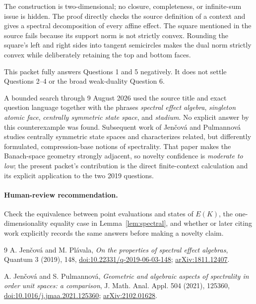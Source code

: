 \documentclass[11pt]{article}
\begin{document}
The construction is two-dimensional; no closure, completeness, or
infinite-sum issue is hidden.  The proof directly checks the source
definition of a context and gives a spectral decomposition of every affine
effect.  The square mentioned in the source fails because its support norm
is not strictly convex.  Rounding the square's left and right sides into
tangent semicircles makes the dual norm strictly convex while deliberately
retaining the top and bottom faces.

This packet fully answers Questions 1 and 5 negatively.  It does not settle
Questions 2--4 or the broad weak-duality Question 6.

A bounded search through 9 August 2026 used the source title and exact
question language together with the phrases \emph{spectral effect algebra},
\emph{singleton atomic face}, \emph{centrally symmetric state space}, and
\emph{stadium}.  No explicit answer by this counterexample was found.
Subsequent work of Jen\v{c}ov\'a and Pulmannov\'a \cite{JPU} studies
centrally symmetric state spaces and characterizes related, but differently
formulated, compression-base notions of spectrality.  That paper makes the
Banach-space geometry strongly adjacent, so novelty confidence is
\emph{moderate to low}; the present packet's contribution is the direct
finite-context calculation and its explicit application to the two 2019
questions.

\paragraph{Human-review recommendation.}
Check the equivalence between point evaluations and states of $E(K)$, the
one-dimensionality equality case in Lemma~\ref{lem:spectral}, and whether
\cite{JPU} or later citing work explicitly records the same answers before
making a novelty claim.

\begin{thebibliography}{9}
A. Jen\v{c}ov\'a and M. Pl\'avala,
\emph{On the properties of spectral effect algebras},
Quantum 3 (2019), 148,
\href{https://doi.org/10.22331/q-2019-06-03-148}{doi:10.22331/q-2019-06-03-148};
\href{https://arxiv.org/abs/1811.12407}{arXiv:1811.12407}.

A. Jen\v{c}ov\'a and S. Pulmannov\'a,
\emph{Geometric and algebraic aspects of spectrality in order unit spaces:
a comparison},
J. Math. Anal. Appl. 504 (2021), 125360,
\href{https://doi.org/10.1016/j.jmaa.2021.125360}{doi:10.1016/j.jmaa.2021.125360};
\href{https://arxiv.org/abs/2102.01628}{arXiv:2102.01628}.
\end{thebibliography}
\end{document}
